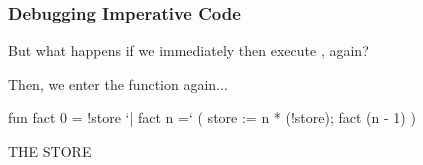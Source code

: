 \documentclass[aspectratio=169]{beamer}
\begin{document}
\begin{frame}[fragile]
  \frametitle{Debugging Imperative Code}

  \begin{minipage}[t][0.6in][t]{\textwidth}
    But what happens if we immediately then execute , again?

    \vspace{\fill}

    Then, we enter the function again...
  \end{minipage}

  \vspace{10pt}

  \begin{center}
    \begin{minipage}[t][1.7in][t]{0.6\textwidth}
      \vspace{\fill}
      \begin{codeblock}
        fun fact 0 = !store
          `| fact n =`
              ( store := n * (!store);
                fact (n - 1)
              )
      \end{codeblock}
      \vspace{\fill}
    \end{minipage}
    \hfill\vline\hfill
    \begin{minipage}[t][1.7in][t]{0.3\textwidth}
      \centering
      {\hspace{-20pt}\color{gray} \large THE STORE}

      \vspace{\fill}
      \vspace{\fill}
    \end{minipage}
  \end{center}
\end{frame}
\end{document}
